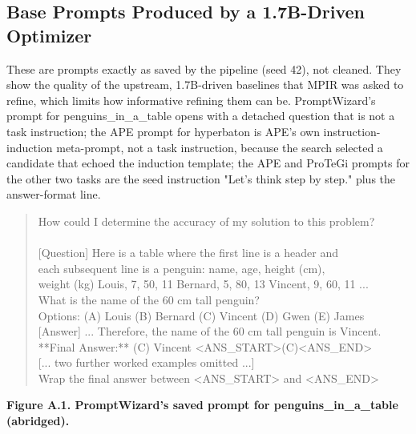 \documentclass{ieeeaccess}
\begin{document}
\subsection{Base Prompts Produced by a 1.7B-Driven Optimizer}

These are prompts exactly as saved by the pipeline (seed 42), not cleaned. They show the quality of the upstream, 1.7B-driven baselines that MPIR was asked to refine, which limits how informative refining them can be. PromptWizard's prompt for penguins\_\allowbreak{}in\_\allowbreak{}a\_\allowbreak{}table opens with a detached question that is not a task instruction; the APE prompt for hyperbaton is APE's own instruction-induction meta-prompt, not a task instruction, because the search selected a candidate that echoed the induction template; the APE and ProTeGi prompts for the other two tasks are the seed instruction "Let's think step by step." plus the answer-format line.

\centering
\begin{quote}\ttfamily\small
How could I determine the accuracy of my solution to this problem?\\{}
~\\{}
[Question] Here is a table where the first line is a header and\\{}
each subsequent line is a penguin: name, age, height (cm),\\{}
weight (kg) Louis, 7, 50, 11 Bernard, 5, 80, 13 Vincent, 9, 60, 11 ...\\{}
What is the name of the 60 cm tall penguin?\\{}
Options: (A) Louis (B) Bernard (C) Vincent (D) Gwen (E) James\\{}
[Answer] ... Therefore, the name of the 60 cm tall penguin is Vincent.\\{}
**Final Answer:** (C) Vincent <ANS\_\allowbreak{}START>(C)<ANS\_\allowbreak{}END>\\{}
[... two further worked examples omitted ...]\\{}
Wrap the final answer between <ANS\_\allowbreak{}START> and <ANS\_\allowbreak{}END>\\{}
\end{quote}
\par\noindent\textbf{Figure A.1. PromptWizard's saved prompt for penguins\_\allowbreak{}in\_\allowbreak{}a\_\allowbreak{}table (abridged).}
\end{document}
